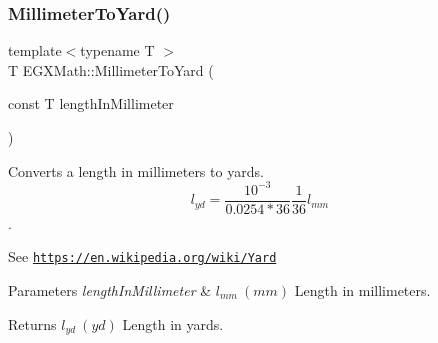 \subsubsection{\texorpdfstring{Millimeter\+To\+Yard()}{MillimeterToYard()}}
{\footnotesize\ttfamily template$<$typename T $>$ \\
T E\+G\+X\+Math\+::\+Millimeter\+To\+Yard (\begin{DoxyParamCaption}\item[{const T}]{length\+In\+Millimeter }\end{DoxyParamCaption})}



Converts a length in millimeters to yards. \[ l_{yd}= \frac{10^{-3}}{0.0254 * 36} \frac{1}{36} l_{mm} \]. 

See \href{https://en.wikipedia.org/wiki/Yard}{\tt https\+://en.\+wikipedia.\+org/wiki/\+Yard} 
\begin{DoxyParams}{Parameters}
{\em length\+In\+Millimeter} & $ l_{mm}\ (mm)$ Length in millimeters. \\
\hline
\end{DoxyParams}
\begin{DoxyReturn}{Returns}
$ l_{yd}\ (yd)$ Length in yards. 
\end{DoxyReturn}
